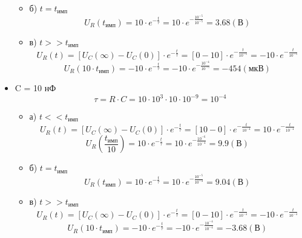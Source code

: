 \begin{itemize}
\begin{itemize}
\item[] б) $t = t_\text{имп}$\\
	\begin{equation}
		U_R(t_\text{имп}) = 10 \cdot e^{-\frac{t}{\tau}} = 10 \cdot e^{-\frac{10^{-5}}{10^{-5}}} = 3.68 (\text{В})
	\end{equation}
	
\item[] в) $t >> t_\text{имп}$\\
	\begin{equation}
		U_R(t) = [U_C(\infty) - U_C(0)] \cdot e^{-\frac{t}{\tau}} = [0 - 10] \cdot e^{-\frac{t}{10^{-5}}} = -10 \cdot e^{-\frac{t}{10^{-5}}}
	\end{equation}
	\begin{equation}
		U_R(10 \cdot t_\text{имп}) = -10 \cdot e^{-\frac{t}{\tau}} = -10 \cdot e^{-\frac{10^{-4}}{10^{-5}}} = -454 (\text{мкВ})
	\end{equation}
\end{itemize}

\item C = 10 нФ\\
\begin{equation}
		\tau = R \cdot C = 10 \cdot 10^3 \cdot 10 \cdot 10^{-9} = 10^{-4}
\end{equation}
\begin{itemize}
\item[] а) $t << t_\text{имп}$\\
	\begin{equation}
		U_R(t) = [U_C(\infty) - U_C(0)] \cdot e^{-\frac{t}{\tau}} = [10 - 0] \cdot e^{-\frac{t}{10^{-4}}} = 10 \cdot e^{-\frac{t}{10^{-4}}}
	\end{equation}
	\begin{equation}
		U_R(\frac{t_\text{имп}}{10}) = 10 \cdot e^{-\frac{t}{\tau}} = 10 \cdot e^{-\frac{10^{-6}}{10^{-4}}} = 9.9 (\text{В})
	\end{equation}

\item[] б) $t = t_\text{имп}$\\
	\begin{equation}
		U_R(t_\text{имп}) = 10 \cdot e^{-\frac{t}{\tau}} = 10 \cdot e^{-\frac{10^{-5}}{10^{-4}}} = 9.04 (\text{В})
	\end{equation}
	
\item[] в) $t >> t_\text{имп}$\\
	\begin{equation}
		U_R(t) = [U_C(\infty) - U_C(0)] \cdot e^{-\frac{t}{\tau}} = [0 - 10] \cdot e^{-\frac{t}{10^{-4}}} = -10 \cdot e^{-\frac{t}{10^{-4}}}
	\end{equation}
	\begin{equation}
		U_R(10 \cdot t_\text{имп}) = -10 \cdot e^{-\frac{t}{\tau}} = -10 \cdot e^{-\frac{10^{-4}}{10^{-4}}} = -3.68 (\text{В})
	\end{equation}
\end{itemize}
\end{itemize}

